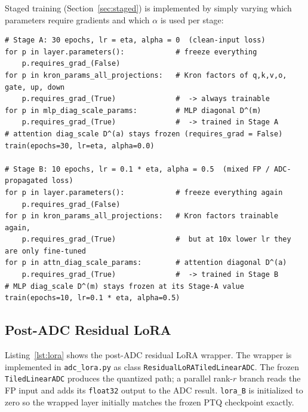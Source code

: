 \documentclass[a4paper,11pt,oneside]{article}
\theoremstyle{breakstyle}
\begin{document}
  Staged training (Section~\ref{sec:staged}) is implemented by simply
  varying which parameters require gradients and which $\alpha$ is
  used per stage:

\begin{lstlisting}[label={lst:staged},caption={Staged training schedule (Stage A then Stage B). At the start of each stage all parameters are frozen and the trainable subset is re-enabled. Kronecker factors of all seven projections are optimised in both stages; the staging only toggles which per-channel diagonal (MLP vs attention) is trained, and Stage B drops the learning rate by 10x so the MLP basis is fine-tuned, not displaced.}]
# Stage A: 30 epochs, lr = eta, alpha = 0  (clean-input loss)
for p in layer.parameters():            # freeze everything
    p.requires_grad_(False)
for p in kron_params_all_projections:   # Kron factors of q,k,v,o, gate, up, down
    p.requires_grad_(True)              #  -> always trainable
for p in mlp_diag_scale_params:         # MLP diagonal D^(m)
    p.requires_grad_(True)              #  -> trained in Stage A
# attention diag_scale D^(a) stays frozen (requires_grad = False)
train(epochs=30, lr=eta, alpha=0.0)

# Stage B: 10 epochs, lr = 0.1 * eta, alpha = 0.5  (mixed FP / ADC-propagated loss)
for p in layer.parameters():            # freeze everything again
    p.requires_grad_(False)
for p in kron_params_all_projections:   # Kron factors trainable again,
    p.requires_grad_(True)              #  but at 10x lower lr they are only fine-tuned
for p in attn_diag_scale_params:        # attention diagonal D^(a)
    p.requires_grad_(True)              #  -> trained in Stage B
# MLP diag_scale D^(m) stays frozen at its Stage-A value
train(epochs=10, lr=0.1 * eta, alpha=0.5)
\end{lstlisting}

  \subsection{Post-ADC Residual LoRA}
  \label{app:code:lora}

  Listing~\ref{lst:lora} shows the post-ADC residual LoRA wrapper.
  The wrapper is implemented in \texttt{adc\_lora.py} as class
  \texttt{ResidualLoRATiledLinearADC}.  The frozen
  \texttt{TiledLinearADC} produces the quantized path; a parallel
  rank-$r$ branch reads the FP input and adds its
  \texttt{float32} output to the ADC result. \texttt{lora\_B} is
  initialized to zero so the wrapped layer initially matches the
  frozen PTQ checkpoint exactly.
\end{document}
